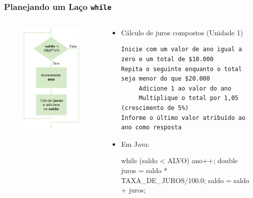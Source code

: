 \documentclass[xcolor={dvipsnames,table},aspectratio=169]{beamer}
\begin{document}
\begin{frame}[fragile]\frametitle{Planejando um Laço \texttt{while}}
\begin{columns}[T]
	\begin{column}{0.3\linewidth}
\begin{figure}[h]
	\includegraphics[height=0.65\paperheight,center]{pucrs-ep-fprog-unidade_04-lacos-laminas-fluxograma_laco.png}
\end{figure}
	\end{column}
	\begin{column}{0.7\linewidth}
		\begin{itemize}
		\item Cálculo de juros compostos (Unidade 1)
{\tiny
\begin{verbatim}
Inicie com um valor de ano igual a zero e um total de $10.000
Repita o seguinte enquanto o total seja menor do que $20.000
     Adicione 1 ao valor do ano
     Multiplique o total por 1,05 (crescimento de 5%)
Informe o último valor atribuído ao ano como resposta
\end{verbatim}
}
		\item Em Java:
{\scriptsize
\begin{javacode}
while (saldo < ALVO) {
   ano++;
   double juros = saldo * TAXA_DE_JUROS/100.0;
   saldo = saldo + juros;
}
\end{javacode}
}
		\end{itemize}
	\end{column}
\end{columns}
\end{frame}
\end{document}
